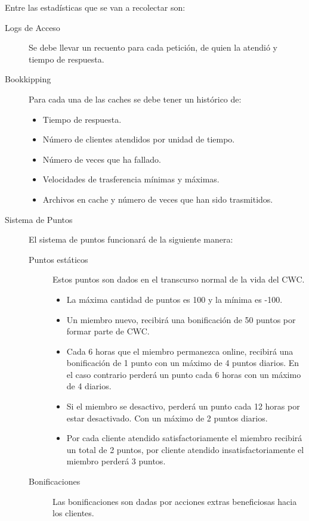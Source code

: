 Entre las estadísticas que se van a recolectar son:

\begin{description}
\item[Logs de Acceso] Se debe llevar un recuento para cada petición, de quien la atendió y tiempo de respuesta.

\item[Bookkipping] Para cada una de las caches se debe tener un histórico de:
	\begin{itemize}
	\item Tiempo de respuesta.
	\item Número de clientes atendidos por unidad de tiempo.
	\item Número de veces que ha fallado.
	\item Velocidades de trasferencia mínimas y máximas.
	\item Archivos en cache y número de veces que han sido trasmitidos.
	\end{itemize}
	
\item[Sistema de Puntos] El sistema de puntos funcionará de la siguiente manera:

	\begin{description}
	\item[Puntos estáticos] Estos puntos son dados en el transcurso normal de la vida del CWC.
		\begin{itemize}
		\item La máxima cantidad de puntos es 100 y la mínima es -100.
		\item  Un miembro nuevo, recibirá una bonificación de 50 puntos por formar parte de CWC.
		\item Cada 6 horas que el miembro permanezca online, recibirá una bonificación de 1 punto con un máximo de 4 puntos diarios. En el caso contrario perderá un punto cada 6 horas con un máximo de 4 diarios.
		\item  Si el miembro se desactivo, perderá un punto cada 12 horas por estar desactivado. Con un máximo de 2 puntos diarios.
		\item Por cada cliente atendido satisfactoriamente el miembro recibirá un total de 2 puntos, por cliente atendido insatisfactoriamente el miembro perderá 3 puntos.
		\end{itemize}
		 
	\item[Bonificaciones] Las bonificaciones son dadas por acciones extras beneficiosas hacia los clientes. 
	

\end{description}
\end{description}
